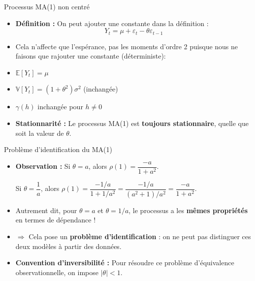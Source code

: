 \documentclass[11pt,aspectratio=169]{beamer}
\newcommand{\E}{\mathbb{E}}
\newcommand{\Var}{\mathbb{V}}
\begin{document}
\begin{frame}{Processus MA(1) non centré}

\begin{itemize}

\item \textbf{Définition :} On peut ajouter une constante dans la définition :
\[
Y_t = \mu + \varepsilon_t - \theta \varepsilon_{t-1}
\]

\item Cela n'affecte que l'espérance, pas les moments d'ordre 2 puisque nous ne faisons que rajouter une constante (déterministe):\newline

\item $\E[Y_t] = \mu$\newline

\item $\Var[Y_t] = (1 + \theta^2) \sigma^2$ (inchangée)\newline

\item $\gamma(h)$ inchangée pour $h \neq 0$\newline

\item \textbf{Stationnarité :} Le processus MA(1) est \textbf{toujours stationnaire}, quelle que soit la valeur de $\theta$.

\end{itemize}
\end{frame}

\begin{frame}{Problème d'identification du MA(1)}

\begin{itemize}

\item \textbf{Observation :} Si $\theta = a$, alors $\rho(1) = \dfrac{-a}{1+a^2}$.

Si $\theta = \dfrac{1}{a}$, alors $\rho(1) = \dfrac{-1/a}{1+1/a^2} = \dfrac{-1/a}{(a^2+1)/a^2} = \dfrac{-a}{1+a^2}$.\newline

\item Autrement dit, pour $\theta = a$ et $\theta = 1/a$, le processus a les \textbf{mêmes propriétés} en termes de dépendance !\newline

\item $\Rightarrow$ Cela pose un \textbf{problème d'identification} : on ne peut pas distinguer ces deux modèles à partir des données.\newline

\item \textbf{Convention d'inversibilité :} Pour résoudre ce problème d'équivalence observationnelle, on impose $|\theta| < 1$.

\end{itemize}
\end{frame}
\end{document}
